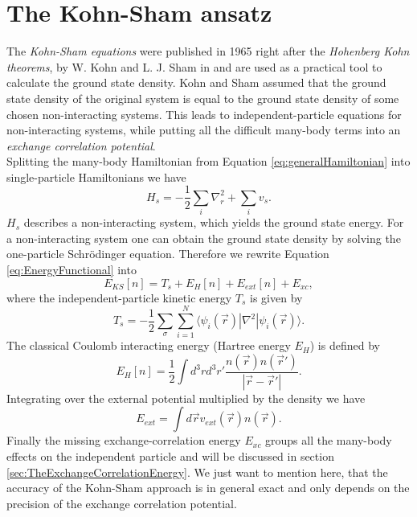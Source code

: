 	\section{The Kohn-Sham ansatz}
		The \textit{Kohn-Sham equations} were published in 1965 right after the \textit{Hohenberg Kohn theorems}, by W. Kohn and L. J. Sham in \cite{KohnSham} and are used as a practical tool to calculate the ground state density. Kohn and Sham assumed that the ground state density of the original system is equal to the ground state density of some chosen non-interacting systems. This leads to independent-particle equations for non-interacting systems, while putting all the difficult many-body terms into an \textit{exchange correlation potential}.\\
		Splitting the many-body Hamiltonian from Equation  \ref{eq:generalHamiltonian} into single-particle Hamiltonians we have 
		\begin{equation}
			H_s = - \frac{1}{2} \sum_i \nabla_r^2 + \sum_i v_s.
		\end{equation} 
		$H_s$ describes a non-interacting system, which yields the ground state energy. For a non-interacting system one can obtain the ground state density by solving the one-particle Schrödinger equation. Therefore we rewrite Equation \ref{eq:EnergyFunctional} into 
		\begin{equation}
			E_{KS}[n] = T_s + E_H[n] + E_{ext}[n] + E_{xc},
		\end{equation}
		where the independent-particle kinetic energy $T_s$ is given by 
		\begin{equation}
			\label{eq:KohnShamKineticEnergy}
			T_s = - \frac{1 }{2} \sum_{\sigma}\sum_{i=1}^{N} \langle \psi_i(\vec r) | \nabla^2 | \psi_i(\vec r) \rangle.
		\end{equation}
		The classical Coulomb interacting energy (Hartree energy $E_H$) is defined by
		\begin{equation}
			E_H[n] = \frac{1}{2} \int d^3r d^3r' \frac{n(\vec r) n(\vec r')}{|\vec r - \vec r'|}. 
		\end{equation}
		Integrating over the external potential multiplied by the density we have
		\begin{equation}
			E_{ext} = \int d\vec r  v_{ext}(\vec r)n(\vec r).
		\end{equation}
		Finally the missing exchange-correlation energy $E_{xc}$ groups all the many-body effects on the independent particle and will be discussed in section \ref{sec:TheExchangeCorrelationEnergy}. We just want to mention here, that the accuracy of the Kohn-Sham approach is in general exact and only depends on the precision of the exchange correlation potential.\\\\
